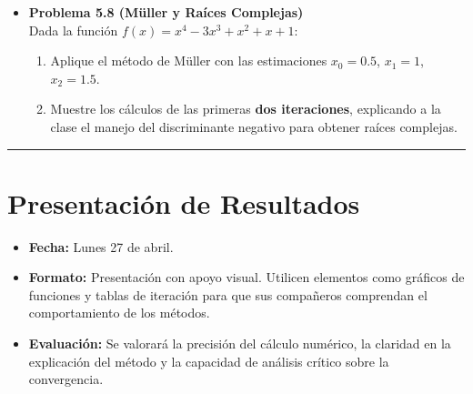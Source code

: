 \documentclass[12pt,letterpaper]{article}
\begin{document}
\begin{itemize}
    \vspace{0.3cm}
    \item \textbf{Problema 5.8 (Müller y Raíces Complejas)} \\
    Dada la función $f(x) = x^4 - 3x^3 + x^2 + x + 1$:
    \begin{enumerate}
        \item Aplique el método de Müller con las estimaciones $x_0 = 0.5$, $x_1 = 1$, $x_2 = 1.5$.
        \item Muestre los cálculos de las primeras \textbf{dos iteraciones}, explicando a la clase el manejo del discriminante negativo para obtener raíces complejas.
    \end{enumerate}

\end{itemize}

\vspace{0.5cm}
\hrule
\vspace{0.5cm}

\section*{Presentación de Resultados}
\begin{itemize}
    \item \textbf{Fecha:} Lunes 27 de abril.
    \item \textbf{Formato:} Presentación con apoyo visual. Utilicen elementos como gráficos de funciones y tablas de iteración para que sus compañeros comprendan el comportamiento de los métodos.
    \item \textbf{Evaluación:} Se valorará la precisión del cálculo numérico, la claridad en la explicación del método y la capacidad de análisis crítico sobre la convergencia.
\end{itemize}
\end{document}
